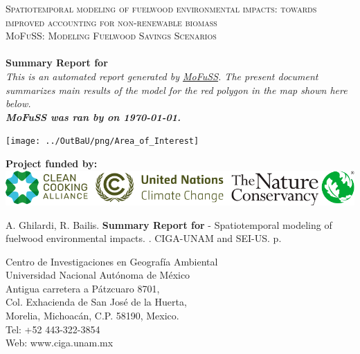 \begin{titlepage}
\begin{center}
	\textsc{\Large Spatiotemporal modeling of fuelwood environmental impacts: towards improved accounting for non-renewable biomass}\\[0.5cm]

\textsc{\Large MoFuSS: Modeling Fuelwood Savings Scenarios}\\[0.25cm]

\HRule \\[0.25cm]
{ \huge \bfseries Summary Report for }
\HRule \\[0.25cm]

\emph{\large This is an automated report generated by \textcolor{blue}{\href{https://www.mofuss.unam.mx}{MoFuSS}}. The present document summarizes main results of the model for the red polygon in the map shown here below.\\ \textbf{MoFuSS was ran by on \today.}} 

\texttt{[image: ../OutBaU/png/Area\_of\_Interest]}

\textbf{Project funded by:}\\
\includegraphics[width=0.75\linewidth]{../LULCC/Wizard_imgs/sponsors_banner}
\end{center}


\pagebreak 

\begin{flushleft}

A. Ghilardi, R. Bailis. \textbf{Summary Report for }- Spatiotemporal modeling of fuelwood environmental impacts. \the\year. CIGA-UNAM and SEI-US. \pageref{lastpage} p.
\bigskip

Centro de Investigaciones en Geografía Ambiental \\
Universidad Nacional Autónoma de México \\
Antigua carretera a Pátzcuaro 8701, \\
Col. Exhacienda de San José de la Huerta, \\
Morelia, Michoacán, C.P. 58190, Mexico. \\
Tel: +52 443-322-3854 \\
Web: www.ciga.unam.mx
\bigskip


\end{flushleft}
\end{titlepage}
